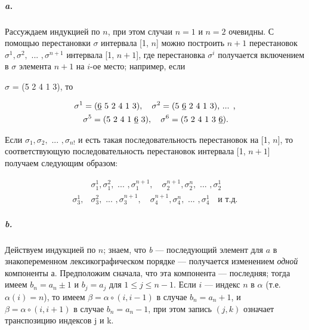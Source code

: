 \documentclass{../../template/mai_book}
\begin{document}
\subparagraph{a.} Рассуждаем индукцией по $n$, при этом случаи $n = 1$ и $n = 2$ очевидны. С помощью перестановки $\sigma$ интервала [1, $n$] можно построить $n + 1$ перестановок $\sigma^1, \sigma^2, \text{ ... } , \sigma^{n + 1}$ интервала [1, $n + 1$], где перестановка $\sigma^i$ получается включением в $\sigma$ элемента $n + 1$ на $i$-ое место; например, если \linebreak

\newpage


\noindent
$\sigma$ = (5 2 4 1 3), то

\begin{equation*}
	\begin{split}
	\sigma^1 &= \text{(\underline{6} 5 2 4 1 3)}, \quad \sigma^2 = \text{(5 \underline{6} 2 4 1 3), ... ,}
	\\
	&\sigma^5 = \text{(5 2 4 1 \underline{6} 3)}, \quad \sigma^6 = \text{(5 2 4 1 3 \underline{6})}.
	\end{split}
\end{equation*}

\noindent
Если $\sigma_1, \sigma_2, \text{ ... } , \sigma_{n!}$ и есть такая последовательность перестановок на [1, $n$], то соответствующую последовательность перестановок интервала [1, $n + 1$] получаем следующим образом:

\begin{equation*}
	\begin{split}
	&\sigma_1^1, \sigma_1^2, \text{ ... } , \sigma_1^{n + 1}, \quad \sigma_2^{n + 1}, \sigma_2^n, \text{ ... } , \sigma_2^1
	\\
	\sigma_3^1, &\sigma_3^2, \text{ ... } , \sigma_3^{n + 1}, \quad \sigma_4^{n + 1}, \sigma_4^n, \text{ ... }, \sigma_4^1 \quad \text{и т.д.}
	\end{split}
\end{equation*}

\subparagraph{b.} Действуем индукцией по $n$; знаем, что \textit{b} —  последующий элемент для $a$ в знакопеременном лексикографическом порядке —  получается изменением \textit{одной} компоненты $а$. Предположим сначала, что эта компонента — последняя; тогда имеем $b_n = a_n \pm 1$ и $b_j = a_j$ для $1 \leqslant j \leqslant n - 1$. Если $i$ — индекс $n$ в $\alpha$ (т.е. $\alpha(i) = n$), то имеем $\beta = \alpha \circ (i, i - 1)$ в случае $b_n = a_n + 1$, и $\beta = \alpha \circ (i, i + 1)$ в случае $b_n = a_n - 1$, при этом запись $(j, k)$ означает транспозицию индексов j и k.
\end{document}
